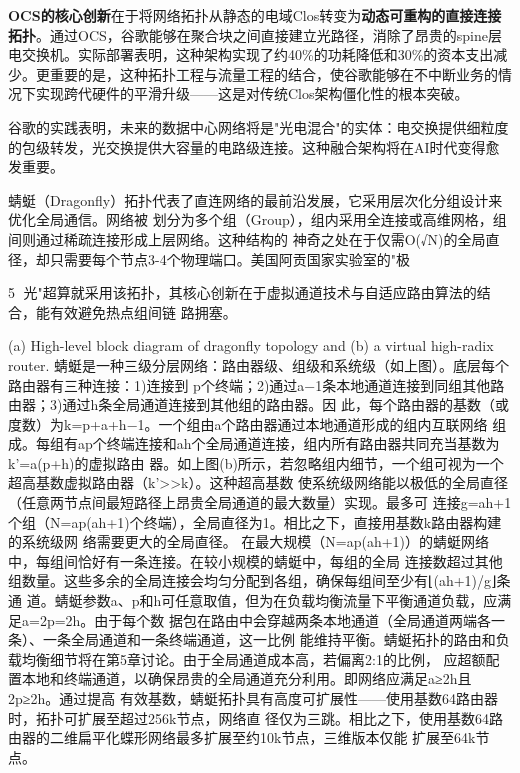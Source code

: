 \textbf{OCS的核心创新}在于将网络拓扑从静态的电域Clos转变为\textbf{动态可重构的直接连接拓扑}。通过OCS，谷歌能够在聚合块之间直接建立光路径，消除了昂贵的spine层电交换机。实际部署表明，这种架构实现了约40\%的功耗降低和30\%的资本支出减少。更重要的是，这种拓扑工程与流量工程的结合，使谷歌能够在不中断业务的情况下实现跨代硬件的平滑升级——这是对传统Clos架构僵化性的根本突破。

谷歌的实践表明，未来的数据中心网络将是"光电混合"的实体：电交换提供细粒度的包级转发，光交换提供大容量的电路级连接。这种融合架构将在AI时代变得愈发重要。

蜻蜓（Dragonfly）拓扑代表了直连网络的最前沿发展，它采用层次化分组设计来优化全局通信。网络被
划分为多个组（Group），组内采用全连接或高维网格，组间则通过稀疏连接形成上层网络。这种结构的
神奇之处在于仅需O(√N)的全局直径，却只需要每个节点3-4个物理端口。美国阿贡国家实验室的"极

                                                            5
光"超算就采用该拓扑，其核心创新在于虚拟通道技术与自适应路由算法的结合，能有效避免热点组间链
路拥塞。




(a) High-level block diagram of dragonfly topology and (b) a virtual high-radix router.
蜻蜓是一种三级分层网络：路由器级、组级和系统级（如上图）。底层每个路由器有三种连接：1)连接到
p个终端；2)通过a−1条本地通道连接到同组其他路由器；3)通过h条全局通道连接到其他组的路由器。因
此，每个路由器的基数（或度数）为k=p+a+h−1。一个组由a个路由器通过本地通道形成的组内互联网络
组成。每组有ap个终端连接和ah个全局通道连接，组内所有路由器共同充当基数为k'=a(p+h)的虚拟路由
器。如上图(b)所示，若忽略组内细节，一个组可视为一个超高基数虚拟路由器（k'>>k）。这种超高基数
使系统级网络能以极低的全局直径（任意两节点间最短路径上昂贵全局通道的最大数量）实现。最多可
连接g=ah+1个组（N=ap(ah+1)个终端），全局直径为1。相比之下，直接用基数k路由器构建的系统级网
络需要更大的全局直径。
在最大规模（N=ap(ah+1)）的蜻蜓网络中，每组间恰好有一条连接。在较小规模的蜻蜓中，每组的全局
连接数超过其他组数量。这些多余的全局连接会均匀分配到各组，确保每组间至少有⌊(ah+1)/g⌋条通
道。蜻蜓参数a、p和h可任意取值，但为在负载均衡流量下平衡通道负载，应满足a=2p=2h。由于每个数
据包在路由中会穿越两条本地通道（全局通道两端各一条）、一条全局通道和一条终端通道，这一比例
能维持平衡。蜻蜓拓扑的路由和负载均衡细节将在第5章讨论。由于全局通道成本高，若偏离2:1的比例，
应超额配置本地和终端通道，以确保昂贵的全局通道充分利用。即网络应满足a≥2h且2p≥2h。通过提高
有效基数，蜻蜓拓扑具有高度可扩展性——使用基数64路由器时，拓扑可扩展至超过256k节点，网络直
径仅为三跳。相比之下，使用基数64路由器的二维扁平化蝶形网络最多扩展至约10k节点，三维版本仅能
扩展至64k节点。

